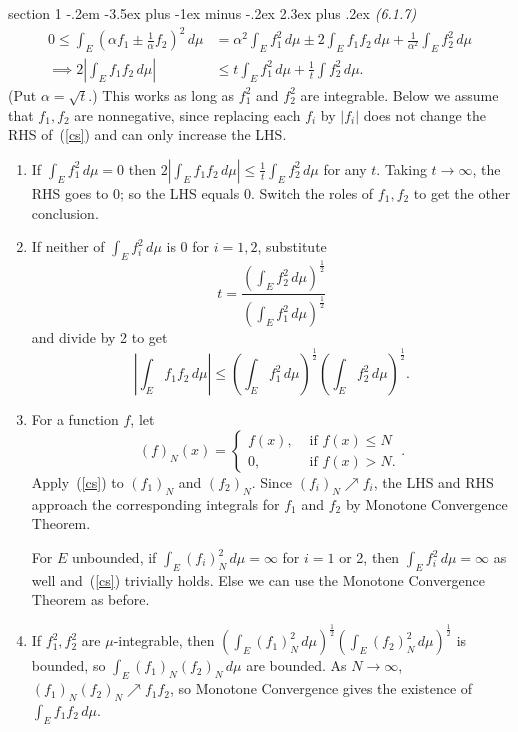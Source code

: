 \documentclass[12pt]{article}
\makeatletter
\theoremstyle{norm}
\newcommand{\rc}[1]{\frac{1}{#1}}
\newcommand{\al}[0]{\alpha}
\newcommand{\ab}[1]{\left| {#1} \right|}
\newcommand{\pa}[1]{\left( {#1} \right)}
\newcommand{\iy}[0]{\infty}
\newenvironment{problem}{\@startsection
       {section}
       {1}
       {-.2em}
       {-3.5ex plus -1ex minus -.2ex}
       {2.3ex plus .2ex}
       {\pagebreak[3]%
       \large\bf\noindent{Problem }
       }
       }
       {%
       }
\makeatother
\begin{document}
\begin{problem}{\it(6.1.7)}
\begin{align}
\label{p5-7-1}
0\le \int_E\pa{\al f_1\pm \rc{\al}f_2}^2\,d\mu
&=\al^2\int_E f_1^2 \,d\mu\pm 2\int_E f_1f_2\,d\mu
+\rc{\al^2}\int_E f_2^2\,d\mu\\
\implies
\label{p5-7-2}
2\ab{\int_E f_1f_2\,d\mu}&\le t\int_E f_1^2\,d\mu+\rc{t}\int f_2^2 \,d\mu.
\end{align}
(Put $\al=\sqrt t$.) This works as long as $f_1^2$ and $f_2^2$ are integrable. Below we assume that $f_1,f_2$ are nonnegative, since replacing each $f_i$ by $|f_i|$ does not change the RHS of~(\ref{cs}) and can only increase the LHS.
\begin{enumerate}
\item
If $\int_E f_1^2\,d\mu =0$ then $2\ab{\int_E f_1f_2\,d\mu}\le \rc{t}\int_E f_2^2\,d\mu$ for any $t$. Taking $t\to \iy$, the RHS goes to 0; so the LHS equals 0. Switch the roles of $f_1,f_2$ to get the other conclusion.
\item
If neither of $\int_E f_i^2\,d\mu$ is $ 0$ for $i=1,2$, substitute
\begin{equation}\label{cst}
t=\frac{\pa{\int_E f_2^2\,d\mu}^{\rc 2}}{\pa{\int_E f_1^2\,d\mu}^{\rc 2}}\end{equation}
and divide by 2 to get
\begin{equation}\label{cs}
\ab{\int_E f_1f_2\,d\mu}\le \pa{\int_E f_1^2\,d\mu}^{\rc 2}\pa{\int_E f_2^2\,d\mu}^{\rc 2}. 
\end{equation}
\item For a function $f$, let
\[
(f)_N(x)=\begin{cases}
f(x),&\text{ if }f(x)\le N\\
0,&\text{ if }f(x)>N.
\end{cases}.
\]
Apply~(\ref{cs}) to $(f_1)_N$ and $(f_2)_N$. Since $(f_i)_N\nearrow f_i$, the LHS and RHS approach the corresponding integrals for $f_1$ and $f_2$ by Monotone Convergence Theorem.

For $E$ unbounded, if $\int_E (f_i)_N^2\,d\mu=\iy$ for $i=1$ or 2, then $\int_E f_i^2\,d\mu=\iy$ as well and~(\ref{cs}) trivially holds. %
Else we can use the Monotone Convergence Theorem as before.
\item If $f_1^2,f_2^2$ are $\mu$-integrable, then $\pa{\int_E (f_1)_N^2\,d\mu}^{\rc 2}\pa{\int_E (f_2)_N^2\,d\mu}^{\rc 2}$ is bounded, so $\int_E(f_1)_N(f_2)_N\,d\mu$ are bounded. As $N\to \iy$, $(f_1)_N(f_2)_N\nearrow f_1f_2$, so Monotone Convergence gives the existence of $\int_E f_1f_2\,d\mu$.


\end{enumerate}
\end{problem}
\end{document}

